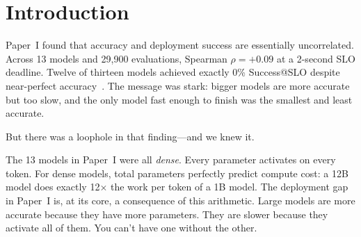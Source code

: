\documentclass[11pt]{article}
\begin{document}
\begin{abstract}
A confound explains the extreme verbosity.  The Qwen3.5 family ships with a ``thinking mode'' that generates chain-of-thought reasoning by default (\texttt{enable\_thinking=True}).  The MoE evaluation ran with thinking mode on, producing ${\sim}$1,500 tokens per response.  The dense Qwen3.5 models ran with thinking mode off, producing concise output.  When we briefly tested the dense 4B with thinking on, it exhibited the same verbosity pattern.  The MoE's catastrophic latency is not an architectural consequence of sparse routing.  It is a training-mode artifact shared across the Qwen3.5 family.

Three other results matter.  The deployment gap is hardware-independent: it persists on Apple Silicon ($\rho = +0.209$, $p = 0.494$ at the Interactive tier across all 13 models).  MLX is 3--9$\times$ faster than CUDA ($\bar{\alpha} = 0.177$).  And a small, fast model (Qwen3.5-0.8B at 59.5\% S@SLO and 735\,ms median) nearly matches Llama-3.2-3B (61.5\% S@SLO, 968\,ms) as a viable deployment target.
\end{abstract}

\section{Introduction}
\label{sec:introduction}

Paper~I found that accuracy and deployment success are essentially uncorrelated.  Across 13 models and 29,900 evaluations, Spearman $\rho = +0.09$ at a 2-second SLO deadline.  Twelve of thirteen models achieved exactly 0\% Success@SLO despite near-perfect accuracy~\citep{maloney2025deploymentgap}.  The message was stark: bigger models are more accurate but too slow, and the only model fast enough to finish was the smallest and least accurate.

But there was a loophole in that finding---and we knew it.

The 13 models in Paper~I were all \emph{dense}.  Every parameter activates on every token.  For dense models, total parameters perfectly predict compute cost: a 12B model does exactly 12$\times$ the work per token of a 1B model.  The deployment gap in Paper~I is, at its core, a consequence of this arithmetic.  Large models are more accurate because they have more parameters.  They are slower because they activate all of them.  You can't have one without the other.
\end{document}
